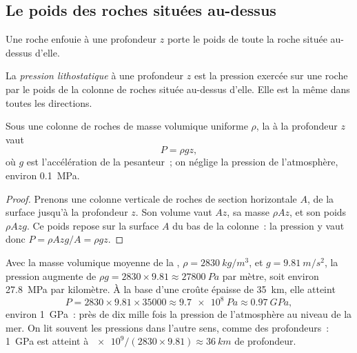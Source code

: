 \subsection{Le poids des roches situées au-dessus}

Une roche enfouie à une profondeur $z$ porte le poids de toute la roche
située au-dessus d'elle.

\begin{definition}\label{def:g12:metamorphic-rocks:lithostatic}
La \emph{pression lithostatique} à une
profondeur $z$ est la pression exercée sur une roche par le poids de la
colonne de roches située au-dessus d'elle. Elle est la même dans toutes les
directions.
\end{definition}

\begin{proposition}\label{prop:g12:metamorphic-rocks:lithostatic}
Sous une colonne de roches de masse volumique uniforme $\rho$, la  à la profondeur $z$ vaut
\[
  P = \rho g z ,
\]
où $g$ est l'accélération de la pesanteur~; on néglige la pression de
l'atmosphère, environ \qty{0.1}{MPa}.
\end{proposition}

\begin{proof}
Prenons une colonne verticale de roches de section horizontale $A$, de la
surface jusqu'à la profondeur $z$. Son volume vaut $Az$, sa masse
$\rho A z$, et son poids $\rho A z g$. Ce poids repose sur la surface $A$
du bas de la colonne~: la pression y vaut donc
$P = \rho A z g / A = \rho g z$.
\end{proof}

Avec la masse volumique moyenne de la ,
$\rho = \qty{2830}{kg/m^3}$, et $g = \qty{9.81}{m/s^2}$, la pression
augmente de $\rho g = 2830 \times 9.81
\approx \qty{27800}{Pa}$ par mètre, soit environ \qty{27.8}{MPa} par
kilomètre. À la base d'une croûte épaisse de \qty{35}{km}, elle atteint
\[
  P = 2830 \times 9.81 \times \num{35000} \approx \qty{9.7e8}{Pa} \approx
  \qty{0.97}{GPa},
\]
environ \qty{1}{GPa}~: près de dix mille fois la pression de l'atmosphère
au niveau de la mer. On lit souvent les pressions dans l'autre sens, comme
des profondeurs~: \qty{1}{GPa} est atteint à
$\num{e9}/(2830 \times 9.81) \approx \qty{36}{km}$ de profondeur.

